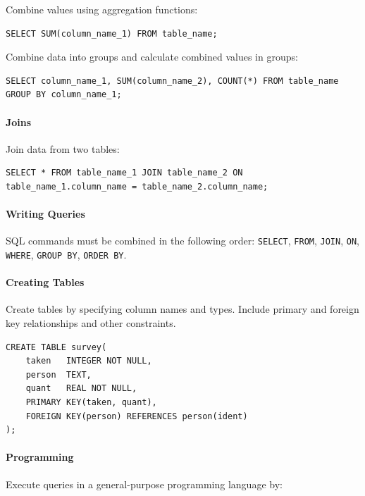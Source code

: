 \documentclass{book}
\begin{document}
Combine values using aggregation functions:

\begin{verbatim}
SELECT SUM(column_name_1) FROM table_name;
\end{verbatim}

Combine data into groups and calculate combined values in groups:

\begin{verbatim}
SELECT column_name_1, SUM(column_name_2), COUNT(*) FROM table_name GROUP BY column_name_1;
\end{verbatim}

\mbox{}\paragraph{Joins}

Join data from two tables:

\begin{verbatim}
SELECT * FROM table_name_1 JOIN table_name_2 ON table_name_1.column_name = table_name_2.column_name;
\end{verbatim}

\mbox{}\paragraph{Writing Queries}

SQL commands must be combined in the following order: \texttt{SELECT},
\texttt{FROM}, \texttt{JOIN}, \texttt{ON}, \texttt{WHERE},
\texttt{GROUP BY}, \texttt{ORDER BY}.

\mbox{}\paragraph{Creating Tables}

Create tables by specifying column names and types. Include primary and
foreign key relationships and other constraints.

\begin{verbatim}
CREATE TABLE survey(
    taken   INTEGER NOT NULL,
    person  TEXT,
    quant   REAL NOT NULL,
    PRIMARY KEY(taken, quant),
    FOREIGN KEY(person) REFERENCES person(ident)
);
\end{verbatim}

\mbox{}\paragraph{Programming}

Execute queries in a general-purpose programming language by:
\end{document}
